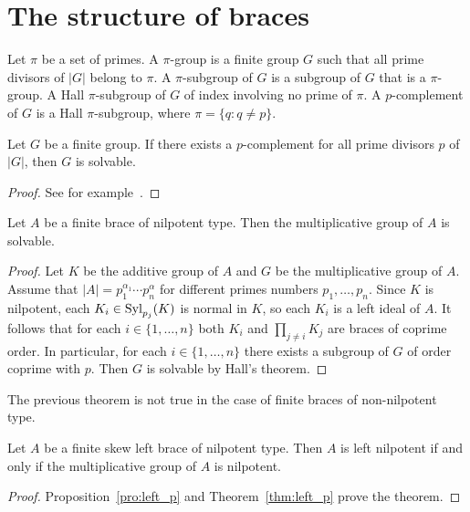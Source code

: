 \chapter{The structure of braces}

Let $\pi$ be a set of primes. A $\pi$-group is a finite group $G$ such that all prime divisors of $|G|$ belong to $\pi$. 
A $\pi$-subgroup of $G$ is a subgroup of $G$ that is a $\pi$-group. 
A Hall $\pi$-subgroup of $G$ of index involving no prime of $\pi$. A $p$-complement 
of $G$ is a Hall $\pi$-subgroup, where $\pi=\{q:q\ne p\}$. 

\begin{theorem}[Hall]
Let $G$ be a finite group. If there exists a $p$-complement 
for all prime divisors $p$ of $|G|$, then 
$G$ is solvable. 
\end{theorem}

\begin{proof}
    See for example~\cite[Theorem 3.15]{MR2426855}. 
\end{proof}

\begin{theorem}
\label{thm:add_nilpotent}
Let $A$ be a finite brace of nilpotent type. Then 
the multiplicative group of $A$ is solvable.
\end{theorem}

\begin{proof}
    Let $K$ be the additive group of $A$ and $G$ be the multiplicative group of $A$. Assume
    that $|A|=p_1^{\alpha_1}\cdots p_n^{\alpha}$ for different primes numbers $p_1,\dots,p_n$. 
    Since $K$ is nilpotent, each $K_i\in\mathrm{Syl}_{p_j}(K)$ is normal in $K$, so 
    each $K_i$ is a left ideal of $A$. It follows that for each $i\in\{1,\dots,n\}$ both $K_i$ and 
    $\prod_{j\ne i}K_j$ are braces of coprime order. In particular, for 
    each $i\in\{1,\dots,n\}$ there exists a subgroup of $G$ of order coprime with $p$. 
    Then $G$ is solvable by Hall's theorem. 
\end{proof}

The previous theorem is not true in the case of finite braces of non-nilpotent type. 

\begin{theorem}
\label{thm:Smoktunowicz}
    Let $A$ be a finite skew left brace of nilpotent type. Then $A$ is
    left nilpotent if and only if the multiplicative group of $A$ is nilpotent.
\end{theorem}

\begin{proof}
    Proposition~\ref{pro:left_p} and Theorem~\ref{thm:left_p} prove the theorem.
\end{proof}


